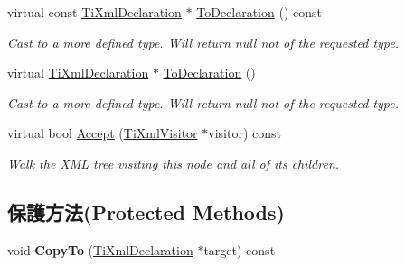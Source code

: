 \begin{DoxyCompactItemize}
\item 
virtual const \hyperlink{class_ti_xml_declaration}{Ti\+Xml\+Declaration} $\ast$ \hyperlink{class_ti_xml_declaration_a1e085d3fefd1dbf5ccdbff729931a967}{To\+Declaration} () const \hypertarget{class_ti_xml_declaration_a1e085d3fefd1dbf5ccdbff729931a967}{}\label{class_ti_xml_declaration_a1e085d3fefd1dbf5ccdbff729931a967}

\begin{DoxyCompactList}\small\item\em Cast to a more defined type. Will return null not of the requested type. \end{DoxyCompactList}\item 
virtual \hyperlink{class_ti_xml_declaration}{Ti\+Xml\+Declaration} $\ast$ \hyperlink{class_ti_xml_declaration_a6bd3d1daddcaeb9543c24bfd090969ce}{To\+Declaration} ()\hypertarget{class_ti_xml_declaration_a6bd3d1daddcaeb9543c24bfd090969ce}{}\label{class_ti_xml_declaration_a6bd3d1daddcaeb9543c24bfd090969ce}

\begin{DoxyCompactList}\small\item\em Cast to a more defined type. Will return null not of the requested type. \end{DoxyCompactList}\item 
virtual bool \hyperlink{class_ti_xml_declaration_ab6a6b178161ba9abc2c35058de689864}{Accept} (\hyperlink{class_ti_xml_visitor}{Ti\+Xml\+Visitor} $\ast$visitor) const \hypertarget{class_ti_xml_declaration_ab6a6b178161ba9abc2c35058de689864}{}\label{class_ti_xml_declaration_ab6a6b178161ba9abc2c35058de689864}

\begin{DoxyCompactList}\small\item\em Walk the X\+ML tree visiting this node and all of its children. \end{DoxyCompactList}\end{DoxyCompactItemize}
\subsection*{保護方法(Protected Methods)}
\begin{DoxyCompactItemize}
\item 
void {\bfseries Copy\+To} (\hyperlink{class_ti_xml_declaration}{Ti\+Xml\+Declaration} $\ast$target) const \hypertarget{class_ti_xml_declaration_a9d08959f935421a593032bd3efb30c38}{}\label{class_ti_xml_declaration_a9d08959f935421a593032bd3efb30c38}

\end{DoxyCompactItemize}
